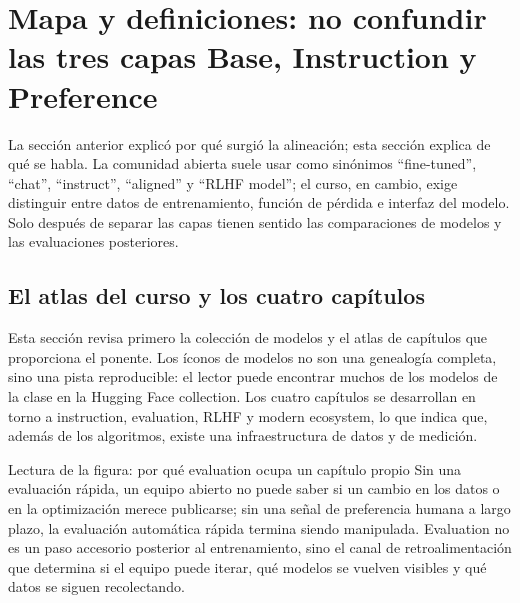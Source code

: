 \section{Mapa y definiciones: no confundir las tres capas Base, Instruction y Preference}

La sección anterior explicó por qué surgió la alineación; esta sección explica de qué se habla. La comunidad abierta suele usar como sinónimos ``fine-tuned'', ``chat'', ``instruct'', ``aligned'' y ``RLHF model''; el curso, en cambio, exige distinguir entre datos de entrenamiento, función de pérdida e interfaz del modelo. Solo después de separar las capas tienen sentido las comparaciones de modelos y las evaluaciones posteriores.

\subsection{El atlas del curso y los cuatro capítulos}

Esta sección revisa primero la colección de modelos y el atlas de capítulos que proporciona el ponente. Los íconos de modelos no son una genealogía completa, sino una pista reproducible: el lector puede encontrar muchos de los modelos de la clase en la Hugging Face collection. Los cuatro capítulos se desarrollan en torno a instruction, evaluation, RLHF y modern ecosystem, lo que indica que, además de los algoritmos, existe una infraestructura de datos y de medición.







\begin{knowledgebox}{Lectura de la figura: por qué evaluation ocupa un capítulo propio}
Sin una evaluación rápida, un equipo abierto no puede saber si un cambio en los datos o en la optimización merece publicarse; sin una señal de preferencia humana a largo plazo, la evaluación automática rápida termina siendo manipulada. Evaluation no es un paso accesorio posterior al entrenamiento, sino el canal de retroalimentación que determina si el equipo puede iterar, qué modelos se vuelven visibles y qué datos se siguen recolectando.
\end{knowledgebox}


